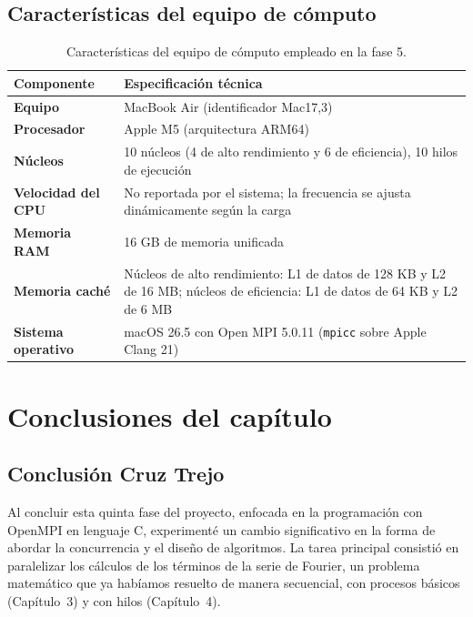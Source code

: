 \subsection*{Características del equipo de cómputo}
\begin{table}[H]
\centering
\renewcommand{\arraystretch}{1.3}
\begin{tabular}{|l|p{10cm}|}
\hline
\textbf{Componente} & \textbf{Especificación técnica} \\ \hline
\textbf{Equipo} & MacBook Air (identificador Mac17,3) \\ \hline
\textbf{Procesador} & Apple M5 (arquitectura ARM64) \\ \hline
\textbf{Núcleos} & 10 núcleos (4 de alto rendimiento y 6 de eficiencia), 10 hilos de ejecución \\ \hline
\textbf{Velocidad del CPU} & No reportada por el sistema; la frecuencia se ajusta dinámicamente según la carga \\ \hline
\textbf{Memoria RAM} & 16 GB de memoria unificada \\ \hline
\textbf{Memoria caché} & Núcleos de alto rendimiento: L1 de datos de 128 KB y L2 de 16 MB; núcleos de eficiencia: L1 de datos de 64 KB y L2 de 6 MB \\ \hline
\textbf{Sistema operativo} & macOS 26.5 con Open MPI 5.0.11 (\texttt{mpicc} sobre Apple Clang 21) \\ \hline
\end{tabular}
\caption{Características del equipo de cómputo empleado en la fase 5.}
\label{tab:cap05:hardware}
\end{table}

\section{Conclusiones del capítulo}
\label{sec:cap05:conclusiones}

\clearpage
\subsection*{Conclusión Cruz Trejo}
Al concluir esta quinta fase del proyecto, enfocada en la programación con OpenMPI en lenguaje C, experimenté un cambio significativo en la forma de abordar la concurrencia y el diseño de algoritmos. La tarea principal consistió en paralelizar los cálculos de los términos de la serie de Fourier, un problema matemático que ya habíamos resuelto de manera secuencial, con procesos básicos (Capítulo~3) y con hilos (Capítulo~4).

